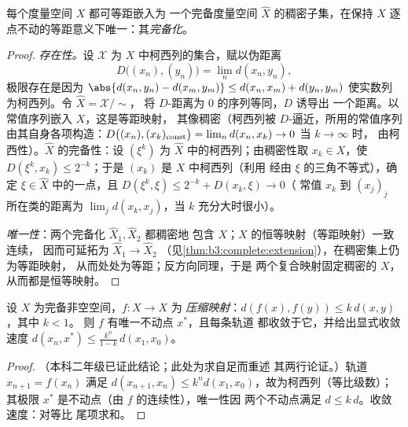 \begin{theorem}[完备化]\label{thm:b3:complete:completion}
每个度量空间 $X$ 都可等距嵌入为
一个完备度量空间 $\hat X$ 的稠密子集，在保持
$X$ 逐点不动的等距意义下唯一：其\emph{完备化}。
\end{theorem}

\begin{proof}
\emph{存在性。}设 $\mathcal X$ 为
$X$ 中柯西列的集合，赋以伪距离
\[
D\bigl((x_n), (y_n)\bigr) = \lim_n d(x_n, y_n),
\]
极限存在是因为 $\abs{d(x_n, y_n) - d(x_m, y_m)}
\leq d(x_n, x_m) + d(y_n, y_m)$ 使实数列
为柯西列。令 $\hat X = \mathcal X/{\sim}$，
将 $D$-距离为 $0$ 的序列等同，$D$ 诱导出
一个距离。以常值序列嵌入 $X$，这是等距映射，
其像稠密（柯西列被 $D$-逼近，所用的常值序列
由其自身各项构造：$D\bigl((x_n), (x_k)_{\rm
const}\bigr) = \lim_n d(x_n, x_k) \to 0$ 当 $k \to \infty$ 时，
由柯西性）。$\hat X$ 的完备性：设 $(\xi^k)$ 为
$\hat X$ 中的柯西列；由稠密性取 $x_k \in X$，使 $D(\xi^k, x_k)
\leq 2^{-k}$；于是 $(x_k)$ 是 $X$ 中柯西列（利用
经由 $\xi$ 的三角不等式），确定 $\xi \in \hat
X$ 中的一点，且 $D(\xi^k, \xi) \leq 2^{-k} + D(x_k, \xi) \to 0$（
常值 $x_k$ 到 $(x_j)_j$ 所在类的距离为
$\lim_j d(x_k, x_j)$，当 $k$ 充分大时很小）。

\emph{唯一性}：两个完备化 $\hat X_1, \hat X_2$ 都稠密地
包含 $X$；$X$ 的恒等映射（等距映射）一致连续，
因而可延拓为 $\hat X_1 \to \hat X_2$
（见\cref{thm:b3:complete:extension}），在稠密集上仍为等距映射，
从而处处为等距；反方向同理，于是
两个复合映射固定稠密的 $X$，从而都是恒等映射。
\end{proof}

\begin{theorem}[巴拿赫不动点定理]\label{thm:b3:complete:banach}
设 $X$ 为完备非空空间，$f \colon X \to X$ 为
\emph{压缩映射}：$d(f(x), f(y)) \leq k\,d(x,y)$，其中 $k < 1$。
则 $f$ 有唯一不动点 $x^*$，且每条轨道
都收敛于它，并给出显式收敛速度 $d(x_n, x^*) \leq
\frac{k^n}{1-k}\,d(x_1, x_0)$。
\end{theorem}

\begin{proof}
（本科二年级已证此结论；此处为求自足而重述
其两行论证。）轨道 $x_{n+1} = f(x_n)$ 满足 $d(x_{n+1},
x_n) \leq k^nd(x_1, x_0)$，故为柯西列（等比级数）；
其极限 $x^*$ 是不动点（由 $f$ 的连续性），唯一性因
两个不动点满足 $d \leq k\,d$。收敛速度：对等比
尾项求和。
\end{proof}

